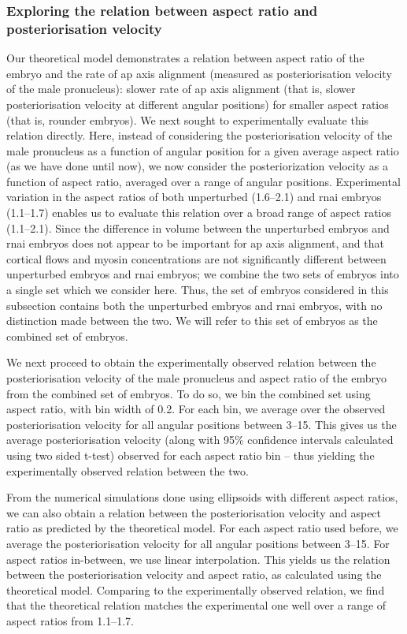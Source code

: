 \subsubsection{Exploring the relation between aspect ratio and posteriorisation velocity}\label{subsubsec:postVelVsAspectRatioExpAndModel}
Our theoretical model demonstrates a relation between aspect ratio of the embryo and the rate of \ac{ap} axis alignment (measured as posteriorisation velocity of the male pronucleus): slower rate of \ac{ap} axis alignment (that is, slower posteriorisation velocity at different angular positions) for smaller aspect ratios (that is, rounder embryos). We next sought to experimentally evaluate this relation directly. Here, instead of considering the posteriorisation velocity of the male pronucleus as a function of angular position for a given average aspect ratio (as we have done until now), we now consider the posteriorization velocity as a function of aspect ratio, averaged over a range of angular positions. Experimental variation in the aspect ratios of both unperturbed (\numrange{1.6}{2.1}) and  \ac{rnai} embryos (\numrange{1.1}{1.7}) enables us to evaluate this relation over a broad range of aspect ratios (\numrange{1.1}{2.1}). Since the difference in volume between the unperturbed embryos and \ac{rnai} embryos does not appear to be important for \ac{ap} axis alignment, and that cortical flows and myosin concentrations are not significantly different between unperturbed embryos and  \ac{rnai} embryos; we combine the two sets of embryos into a single set which we consider here. Thus, the set of embryos considered in this subsection contains both the unperturbed embryos and \ac{rnai} embryos, with no distinction made between the two. We will refer to this set of embryos as the combined set of embryos.

We next proceed to obtain the experimentally observed relation between the posteriorisation velocity of the male pronucleus and aspect ratio of the embryo from the combined set of embryos. To do so, we bin the combined set using aspect ratio, with bin width of \num{0.2}. For each bin, we average over the observed posteriorisation velocity for all angular positions between \SIrange{3}{15}{\unitAngle}. This gives us the average posteriorisation velocity (along with \num{95}\% confidence intervals calculated using two sided t-test) observed for each aspect ratio bin -- thus yielding the experimentally observed relation between the two.

From the numerical simulations done using ellipsoids with different aspect ratios, we can also obtain a relation between the posteriorisation velocity and aspect ratio as predicted by the theoretical model. For each aspect ratio used before, we average the posteriorisation velocity for all angular positions between \SIrange{3}{15}{\unitAngle}. For aspect ratios in-between, we use linear interpolation. This yields us the relation between the posteriorisation velocity and aspect ratio, as calculated using the theoretical model. Comparing to the experimentally observed relation, we find that the theoretical relation matches the experimental one well over a range of aspect ratios from \numrange{1.1}{1.7}.

